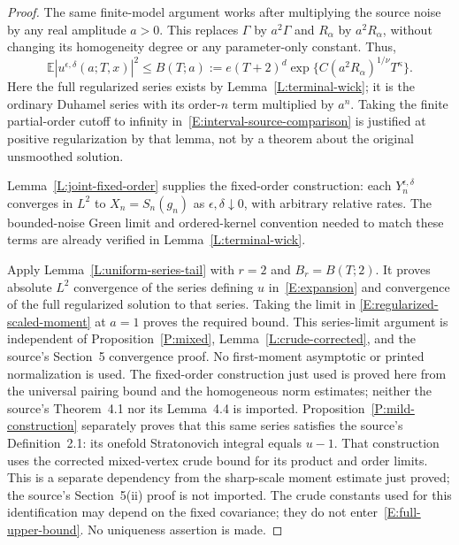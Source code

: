 \documentclass[12pt]{article}
\numberwithin{equation}{section}
\theoremstyle{definition}
\newcommand{\E}{\mathbb{E}}
\begin{document}
\begin{proof}
  The same finite-model argument works after multiplying the source
  noise by any real amplitude $a>0$. This replaces $\Gamma$ by
  $a^2\Gamma$ and $R_\alpha$ by $a^2R_\alpha$, without changing its
  homogeneity degree or any parameter-only constant. Thus,
  \begin{equation}\label{E:regularized-scaled-moment}
    \E|u^{\epsilon,\delta}(a;T,x)|^2
    \le B(T;a):=e(T+2)^d
    \exp\{C(a^2R_\alpha)^{1/\nu}T^\kappa\}.
  \end{equation}
  Here the full regularized series exists by
  Lemma~\ref{L:terminal-wick}; it is the ordinary Duhamel series with
  its order-$n$ term multiplied by $a^n$. Taking the finite partial-order
  cutoff to infinity in~\eqref{E:interval-source-comparison} is justified
  at positive regularization by that lemma, not by a theorem about the
  original unsmoothed solution.

  Lemma~\ref{L:joint-fixed-order} supplies the fixed-order construction:
  each $Y_n^{\epsilon,\delta}$ converges in $L^2$ to $X_n=S_n(g_n)$
  as $\epsilon,\delta\downarrow0$, with arbitrary relative rates.
  The bounded-noise Green limit and ordered-kernel convention needed
  to match these terms are already verified in
  Lemma~\ref{L:terminal-wick}.

  Apply Lemma~\ref{L:uniform-series-tail} with $r=2$ and
  $B_r=B(T;2)$. It proves absolute $L^2$ convergence of the series
  defining $u$ in~\eqref{E:expansion} and convergence of the full
  regularized solution to that series. Taking the limit in
  \eqref{E:regularized-scaled-moment} at $a=1$ proves the required bound.
  This series-limit argument is independent of
  Proposition~\ref{P:mixed}, Lemma~\ref{L:crude-corrected}, and the
  source's Section~5 convergence proof. No first-moment asymptotic or
  printed normalization is used. The fixed-order construction just used is proved here from the
  universal pairing bound and the homogeneous norm estimates; neither
  the source's Theorem~4.1 nor its Lemma~4.4 is imported.
  Proposition~\ref{P:mild-construction} separately proves that this
  same series satisfies the source's Definition~2.1: its onefold
  Stratonovich integral equals $u-1$. That construction uses the
  corrected mixed-vertex crude bound for its product and order limits.
  This is a separate dependency from the sharp-scale moment estimate
  just proved; the source's Section~5(ii) proof is not imported.
  The crude constants used for this identification may depend on the
  fixed covariance; they do not enter~\eqref{E:full-upper-bound}.
  No uniqueness assertion is made.


\end{proof}
\end{document}
